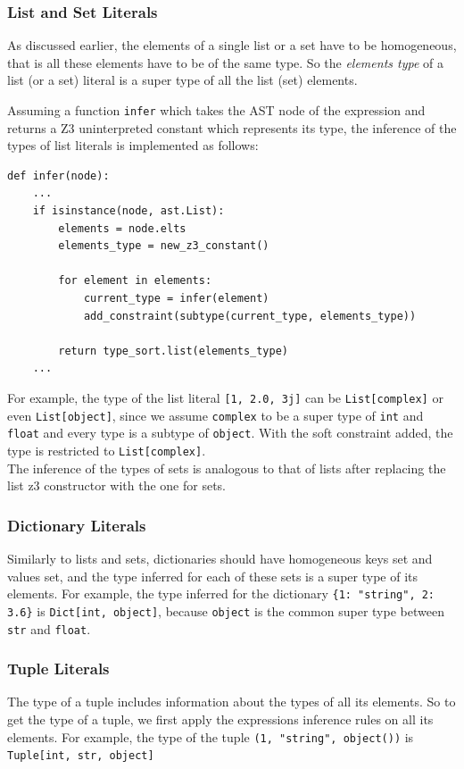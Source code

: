 \subsubsection{List and Set Literals}
As discussed earlier, the elements of a single list or a set have to be homogeneous, that is all these elements have to be of the same type. So the \textit{elements type} of a list (or a set) literal is a super type of all the list (set) elements.

Assuming a function \lstinline|infer| which takes the AST node of the expression and returns a Z3 uninterpreted constant which represents its type, the inference of the types of list literals is implemented as follows:

\begin{lstlisting}
def infer(node):
	...
	if isinstance(node, ast.List):
		elements = node.elts
		elements_type = new_z3_constant()
		
		for element in elements:
			current_type = infer(element)
			add_constraint(subtype(current_type, elements_type))
			
		return type_sort.list(elements_type)
	...
\end{lstlisting}

For example, the type of the list literal \lstinline|[1, 2.0, 3j]| can be \lstinline|List[complex]| or even \lstinline|List[object]|, since we assume \lstinline|complex| to be a super type of \lstinline|int| and \lstinline|float| and every type is a subtype of \lstinline|object|. With the soft constraint added, the type is restricted to \lstinline|List[complex]|.\\

The inference of the types of sets is analogous to that of lists after replacing the list z3 constructor with the one for sets.


\subsubsection{Dictionary Literals}
Similarly to lists and sets, dictionaries should have homogeneous keys set and values set, and the type inferred for each of these sets is a super type of its elements. For example, the type inferred for the dictionary \lstinline|{1: "string", 2: 3.6}| is \lstinline|Dict[int, object]|, because \lstinline|object| is the common super type between \lstinline|str| and \lstinline|float|.


\subsubsection{Tuple Literals}
The type of a tuple includes information about the types of all its elements. So to get the type of a tuple, we first apply the expressions inference rules on all its elements. For example, the type of the tuple \lstinline|(1, "string", object())| is \lstinline|Tuple[int, str, object]|

